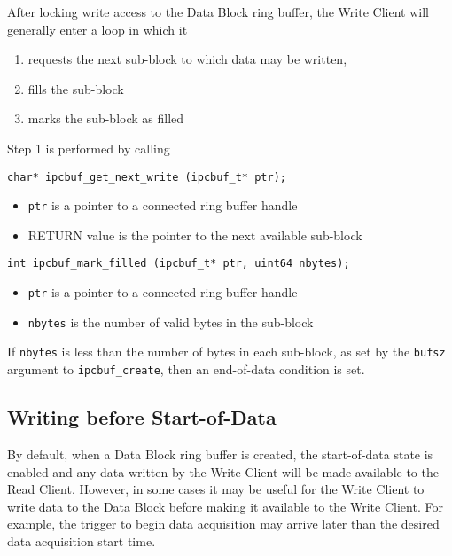 After locking write access to the Data Block ring buffer, the Write
Client will generally enter a loop in which it
\begin{enumerate}
\item requests the next sub-block to which data may be written, 
\item fills the sub-block
\item marks the sub-block as filled
\end{enumerate}
Step 1 is performed by calling
\begin{verbatim}
char* ipcbuf_get_next_write (ipcbuf_t* ptr);
\end{verbatim}
\vspace{-3mm}
\begin{itemize}
\item {\tt ptr} is a pointer to a connected ring buffer handle
\item RETURN value is the pointer to the next available sub-block
\end{itemize}
\begin{verbatim}
int ipcbuf_mark_filled (ipcbuf_t* ptr, uint64 nbytes);
\end{verbatim}
\vspace{-3mm}
\begin{itemize}
\item {\tt ptr} is a pointer to a connected ring buffer handle
\item {\tt nbytes} is the number of valid bytes in the sub-block
\end{itemize}

If {\tt nbytes} is less than the number of bytes in each sub-block, as
set by the {\tt bufsz} argument to {\tt ipcbuf\_create}, then an
end-of-data condition is set.

\subsection{Writing before Start-of-Data}
\label{sec:prewrite}

By default, when a Data Block ring buffer is created, the
start-of-data state is enabled and any data written by the Write
Client will be made available to the Read Client.  However, in some
cases it may be useful for the Write Client to write data to the Data
Block before making it available to the Write Client.  For example,
the trigger to begin data acquisition may arrive later than the
desired data acquisition start time.

